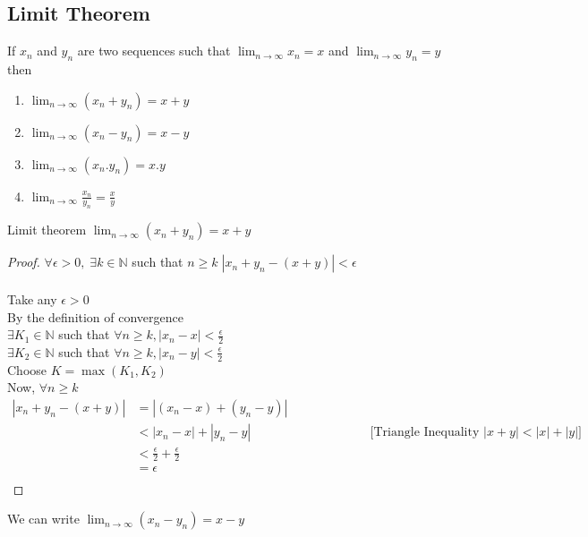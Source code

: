 \documentclass{article}
\newcommand{\hs}{\hspace}
\begin{document}
\subsection*{Limit Theorem}
If $x_n$ and $y_n$ are two sequences such that $\lim_{n\to\infty}x_n=x$ and $\lim_{n\to\infty}y_n=y$ then
\begin{enumerate}
    \item $\displaystyle\lim_{n\to\infty}(x_n+y_n)=x+y$
    \item $\displaystyle\lim_{n\to\infty}(x_n-y_n)=x-y$
    \item $\displaystyle\lim_{n\to\infty}(x_n.y_n)=x.y$
    \item $\displaystyle\lim_{n\to\infty}\frac{x_n}{y_n}=\frac{x}{y}$
\end{enumerate}
\begin{theorem}{Limit theorem}\;
    $\displaystyle\lim_{n\to\infty}(x_n+y_n)=x+y$
\begin{proof}
    $\forall\epsilon>0,\; \exists k \in \mathbb{N}$\; such that $n\geq k\;|x_n+y_n-(x+y)|<\epsilon$\\\\
    Take any $\epsilon >0$\\ By the definition of convergence\\
    $\exists K_1 \in \mathbb{N}$\; such that $\forall n \geq k, |x_n-x|<\frac{\epsilon}{2}$\\
    $\exists K_2 \in \mathbb{N}$\; such that $\forall n \geq k, |x_n-y|<\frac{\epsilon}{2}$\\
    Choose $K=\max(K_1,K_2)$\\Now, $\forall n\geq k$\\
    \begin{align*}
        |x_n+y_n-(x+y)|
         & =|(x_n-x)+(y_n-y)| \hs{4cm}                                                           \\
         & <|x_n-x|+|y_n-y|                       \hs{4cm} \text{[Triangle Inequality $|x+y|<|x|+|y|$]} \\
         & <\frac{\epsilon}{2}+\frac{\epsilon}{2}                                                \\
         & =\epsilon                                                                             \\
    \end{align*}
\end{proof}
\end{theorem}
\begin{theorem}{}{}
    We can write $\displaystyle\lim_{n\to\infty}(x_n-y_n)=x-y$
\end{theorem}
\end{document}
